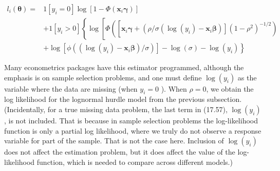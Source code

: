 \documentclass[10pt]{article}
\begin{document}
\begin{align*}
l_{i}(\boldsymbol{\theta})= & 1\left[y_{i}=0\right] \log \left[1-\Phi\left(\mathbf{x}_{i} \boldsymbol{\gamma}\right)\right] \\
& +1\left[y_{i}>0\right]\left\{\operatorname { l o g } \left[\Phi \left(\left[\mathbf{x}_{i} \boldsymbol{\gamma}+\left(\rho / \sigma\left(\log \left(y_{i}\right)-\mathbf{x}_{i} \boldsymbol{\beta}\right)\right]\left(1-\rho^{2}\right)^{-1 / 2}\right)\right.\right.\right. \\
& \left.+\log \left[\phi\left(\left(\log \left(y_{i}\right)-\mathbf{x}_{i} \boldsymbol{\beta}\right) / \sigma\right)\right]-\log (\sigma)-\log \left(y_{i}\right)\right\} \tag{17.57}
\end{align*}


Many econometrics packages have this estimator programmed, although the emphasis is on sample selection problems, and one must define $\log \left(y_{i}\right)$ as the variable where the data are missing (when $y_{i}=0$ ). When $\rho=0$, we obtain the log likelihood for the lognormal hurdle model from the previous subsection. (Incidentally, for a true missing data problem, the last term in (17.57), $\log \left(y_{i}\right)$, is not included. That is because in sample selection problems the log-likelihood function is only a partial log likelihood, where we truly do not observe a response variable for part of the sample. That is not the case here. Inclusion of $\log \left(y_{i}\right)$ does not affect the estimation problem, but it does affect the value of the log-likelihood function, which is needed to compare across different models.)
\end{document}
